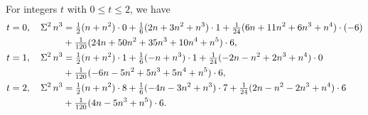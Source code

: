 \begin{example}
  For integers $t$ with $0 \leq t \leq 2$, we have
  \begin{align*}
    t=0, \quad \Sigma^{2}\,{n}^{3}
    &=
    \tfrac{1}{2}(n+n^2)\cdot0
    +\tfrac{1}{6}(2n+3n^2+n^3)\cdot1
    +\tfrac{1}{24}(6n+11n^2+6n^3+n^4)\cdot(-6) \\
    &+\tfrac{1}{120}(24n+50n^2+35n^3+10n^4+n^5)\cdot6,
    \\
    t=1, \quad \Sigma^{2}\,{n}^{3}
    &=
    \tfrac{1}{2}(n+n^2)\cdot1
    +\tfrac{1}{6}(-n+n^3)\cdot1
    +\tfrac{1}{24}(-2n-n^2+2n^3+n^4)\cdot0 \\
    &+\tfrac{1}{120}(-6n-5n^2+5n^3+5n^4+n^5)\cdot6,
    \\
    t=2, \quad \Sigma^{2}\,{n}^{3}
    &=
    \tfrac{1}{2}(n+n^2)\cdot8
    +\tfrac{1}{6}(-4n-3n^2+n^3)\cdot7
    +\tfrac{1}{24}(2n-n^2-2n^3+n^4)\cdot6 \\
    &+\tfrac{1}{120}(4n-5n^3+n^5)\cdot6.
  \end{align*}
\end{example}

